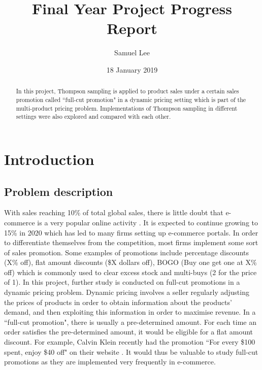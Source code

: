 \documentclass[a4paper]{article}
\title{Final Year Project Progress Report}
\author{Samuel Lee}
\date{18 January 2019}
\begin{document}
\maketitle

\begin{abstract}
In this project, Thompson sampling is applied to product sales under a certain sales promotion called ``full-cut promotion" in a dynamic pricing setting which is part of the multi-product pricing problem. Implementations of Thompson sampling in different settings were also explored and compared with each other.


\end{abstract}

\section{Introduction}
\subsection{Problem description}
With sales reaching 10\% of total global sales, there is little doubt that e-commerce is a very popular online activity \cite{nano3}. It is expected to continue growing to 15\% in 2020 which has led to many firms setting up e-commerce portals. In order to differentiate themselves from the competition, most firms implement some sort of sales promotion. Some examples of promotions include percentage discounts (X\% off), flat amount discounts (\$X dollars off), BOGO (Buy one get one at X\% off) which is commonly used to clear excess stock and multi-buys (2 for the price of 1). In this project, further study is conducted on full-cut promotions in a dynamic pricing problem. Dynamic pricing involves a seller regularly adjusting the prices of products in order to obtain information about the products' demand, and then exploiting this information in order to maximise revenue. In a ``full-cut promotion", there is usually a pre-determined amount. For each time an order satisfies the pre-determined amount, it would be eligible for a flat amount discount. For example, Calvin Klein recently had the promotion ``For every \$100 spent, enjoy \$40 off" on their website \cite{CK}. It would thus be valuable to study full-cut promotions as they are implemented very frequently in e-commerce. 
\end{document}
